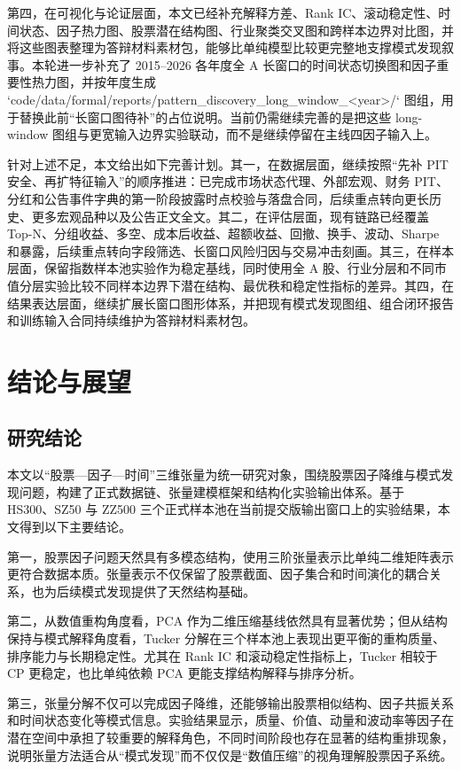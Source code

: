 第四，在可视化与论证层面，本文已经补充解释方差、Rank IC、滚动稳定性、时间状态、因子热力图、股票潜在结构图、行业聚类交叉图和跨样本边界对比图，并将这些图表整理为答辩材料素材包，能够比单纯模型比较更完整地支撑模式发现叙事。本轮进一步补充了 2015--2026 各年度全 A 长窗口的时间状态切换图和因子重要性热力图，并按年度生成 `code/data/formal/reports/pattern_discovery_long_window_<year>/` 图组，用于替换此前“长窗口图待补”的占位说明。当前仍需继续完善的是把这些 long-window 图组与更宽输入边界实验联动，而不是继续停留在主线四因子输入上。

针对上述不足，本文给出如下完善计划。其一，在数据层面，继续按照“先补 PIT 安全、再扩特征输入”的顺序推进：已完成市场状态代理、外部宏观、财务 PIT、分红和公告事件字典的第一阶段披露时点校验与落盘合同，后续重点转向更长历史、更多宏观品种以及公告正文全文。其二，在评估层面，现有链路已经覆盖 Top-N、分组收益、多空、成本后收益、超额收益、回撤、换手、波动、Sharpe 和暴露，后续重点转向字段筛选、长窗口风险归因与交易冲击刻画。其三，在样本层面，保留指数样本池实验作为稳定基线，同时使用全 A 股、行业分层和不同市值分层实验比较不同样本边界下潜在结构、最优秩和稳定性指标的差异。其四，在结果表达层面，继续扩展长窗口图形体系，并把现有模式发现图组、组合闭环报告和训练输入合同持续维护为答辩材料素材包。

\chapter{结论与展望}

\section{研究结论}

本文以“股票—因子—时间”三维张量为统一研究对象，围绕股票因子降维与模式发现问题，构建了正式数据链、张量建模框架和结构化实验输出体系。基于 HS300、SZ50 与 ZZ500 三个正式样本池在当前提交版输出窗口上的实验结果，本文得到以下主要结论。

第一，股票因子问题天然具有多模态结构，使用三阶张量表示比单纯二维矩阵表示更符合数据本质。张量表示不仅保留了股票截面、因子集合和时间演化的耦合关系，也为后续模式发现提供了天然结构基础。

第二，从数值重构角度看，PCA 作为二维压缩基线依然具有显著优势；但从结构保持与模式解释角度看，Tucker 分解在三个样本池上表现出更平衡的重构质量、排序能力与长期稳定性。尤其在 Rank IC 和滚动稳定性指标上，Tucker 相较于 CP 更稳定，也比单纯依赖 PCA 更能支撑结构解释与排序分析。

第三，张量分解不仅可以完成因子降维，还能够输出股票相似结构、因子共振关系和时间状态变化等模式信息。实验结果显示，质量、价值、动量和波动率等因子在潜在空间中承担了较重要的解释角色，不同时间阶段也存在显著的结构重排现象，说明张量方法适合从“模式发现”而不仅仅是“数值压缩”的视角理解股票因子系统。

